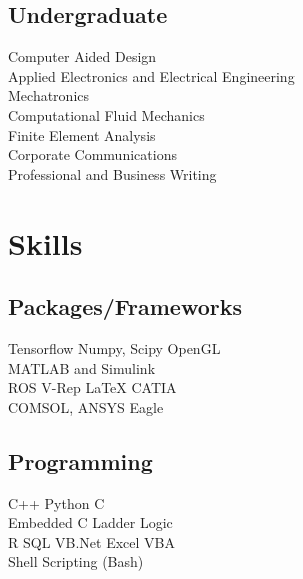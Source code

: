 \documentclass[]{deedy-resume-openfont}
\begin{document}
\begin{minipage}[t]{0.33\textwidth}
\sectionsep{}

\subsection{Undergraduate}
Computer Aided Design \\
Applied Electronics and Electrical Engineering\\
Mechatronics \\
Computational Fluid Mechanics\\
Finite Element Analysis\\
Corporate Communications\\
Professional and Business Writing\\
\sectionsep


\section{Skills}
\subsection{Packages/Frameworks}

Tensorflow \textbullet{}Numpy, Scipy \textbullet{} OpenGL\\ 
MATLAB and Simulink \textbullet{}\\
ROS \textbullet{} V-Rep \textbullet{} \LaTeX \textbullet{}
CATIA\\ COMSOL, ANSYS \textbullet{} Eagle

\sectionsep
\sectionsep
\subsection{Programming}
C++ \textbullet{} Python \textbullet{} C\\
Embedded C \textbullet{}Ladder Logic\\
R \textbullet{} SQL \textbullet{} VB.Net \textbullet{} Excel VBA\\
Shell Scripting (Bash)

%
%

\end{minipage} 
\hfill
\end{document}
